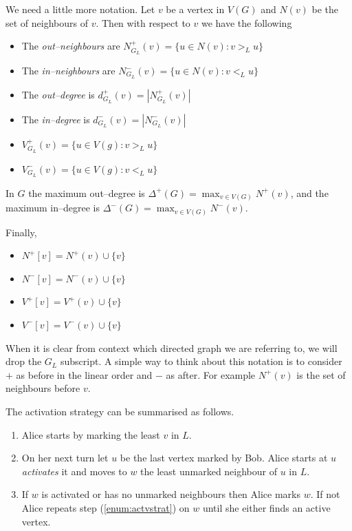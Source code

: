 We need a little more notation. Let $v$ be a vertex in $V(G)$ and $N(v)$ be the set of neighbours of $v$. Then with respect to $v$ we have the following
\begin{itemize}        
    \item The \textit{out--neighbours} are $N^+_{G_L}(v)=\{u\in N(v):v>_L u\}$ 
    \item The \textit{in--neighbours} are $N^-_{G_L}(v)=\{u\in N(v):v<_L u\}$ 
    \item The \textit{out--degree} is $d^+_{G_L}(v)=|N^+_{G_L}(v)|$ 
    \item The \textit{in--degree} is $d^-_{G_L}(v)=|N^-_{G_L}(v)|$
    \item $V^+_{G_L}(v)=\{u\in V(g):v>_L u\}$     
    \item $V^-_{G_L}(v)=\{u\in V(g):v<_L u\}$ 
\end{itemize}

In $G$ the maximum out--degree is $\Delta^+(G)=\max_{v\in V(G)}N^+(v)$, and 
the maximum in--degree is $\Delta^-(G)=\max_{v\in V(G)}N^-(v)$. 

Finally,
\begin{itemize}  
    \item $N^+[v]=N^+(v)\cup\{v\}$
    \item $N^-[v]=N^-(v)\cup\{v\}$
    \item $V^+[v]=V^+(v)\cup\{v\}$
    \item $V^-[v]=V^-(v)\cup\{v\}$
\end{itemize}
When it is clear from context which directed graph we are referring to, we will drop the $G_L$ subscript.  A simple way to think about this notation is to consider $+$ as before in the linear order and $-$ as after. For example $N^+(v)$ is the set of neighbours before $v$.

The activation strategy can be summarised as follows. 
\begin{enumerate}
    \item Alice starts by marking the least $v$ in $L$.
    \item On her next turn let $u$ be the last vertex marked by Bob. Alice starts at $u$ \textit{activates} it and moves to $w$ the least unmarked neighbour of $u$ in $L$. \label{enum:actvstrat}
    \item If $w$ is activated or has no unmarked neighbours then Alice marks $w$. If not Alice repeats step (\ref{enum:actvstrat}) on $w$ until she either finds an active vertex.
\end{enumerate}

